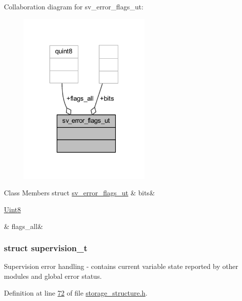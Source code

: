 Collaboration diagram for sv\+\_\+error\+\_\+flags\+\_\+ut\+:
\nopagebreak
\begin{figure}[H]
\begin{center}
\leavevmode
\includegraphics[width=184pt]{d6/d43/a00216}
\end{center}
\end{figure}
\begin{DoxyFields}{Class Members}
\hypertarget{a00003_afa2ba38f241c1ae65e907d56c9a68065}{struct \hyperlink{a00003_d4/ddd/a00138}{sv\+\_\+error\+\_\+flags\+\_\+ut}}\label{a00003_afa2ba38f241c1ae65e907d56c9a68065}
&
bits&
\\
\hline

\hypertarget{a00003_a0f01d49aa613ecb0f5a785a154c7f626}{\hyperlink{a00001_a979e3e23b9a449e69ab6a8a83b6042f8}{Uint8}}\label{a00003_a0f01d49aa613ecb0f5a785a154c7f626}
&
flags\+\_\+all&
\\
\hline

\end{DoxyFields}
\label{d5/d5b/a00135}
\hypertarget{a00003_d5/d5b/a00135}{}
\subsubsection{struct supervision\+\_\+t}
Supervision error handling -\/ contains current variable state reported by other modules and global error status. 

Definition at line \hyperlink{a00003_source_l00072}{72} of file \hyperlink{a00003_source}{storage\+\_\+structure.\+h}.



